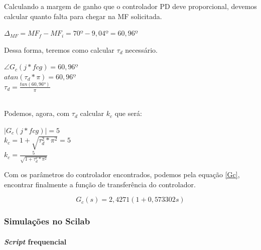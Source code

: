 Calculando a margem de ganho que o controlador PD deve proporcional, devemos calcular quanto falta para chegar na MF solicitada.

\begin{center}
    $\Delta_{MF} = MF_f - MF_i = 70º - 9,04º = 60,96º$ \vspace{4pt}\\
\end{center}

Dessa forma, teremos como calcular $\tau_d$ necessário.

\begin{center}
    $\angle G_c(j*fcg) = 60,96º$ \vspace{4pt}\\
    $atan (\tau_d * \pi) = 60,96º$ \vspace{4pt}\\
    $\tau_d = \frac{tan(60,96º)}{\pi}$  \vspace{4pt}\\
      \vspace{4pt}\\
    
\end{center}

Podemos, agora, com $\tau_d$ calcular $k_c$ que será:

\begin{center}
    $|G_c(j*fcg)| = 5$\vspace{4pt}\\
    $k_c = 1 + \sqrt{\tau_d^2*\pi^2} = 5$ \vspace{4pt}\\
    $k_c = \frac{5}{\sqrt{1+ \tau_d^2*\pi^2}}$ \vspace{4pt}\\
\end{center}

Com os parâmetros do controlador encontrados, podemos pela equação \ref{Gc}, encontrar finalmente a função de transferência do controlador.

\begin{equation} \label{PD:eq}
    \boxed {G_c(s) = 2,4271(1+0,573302s)}
\end{equation}

\subsubsection{Simulações no Scilab}

\paragraph{\textit{Script} frequencial}

